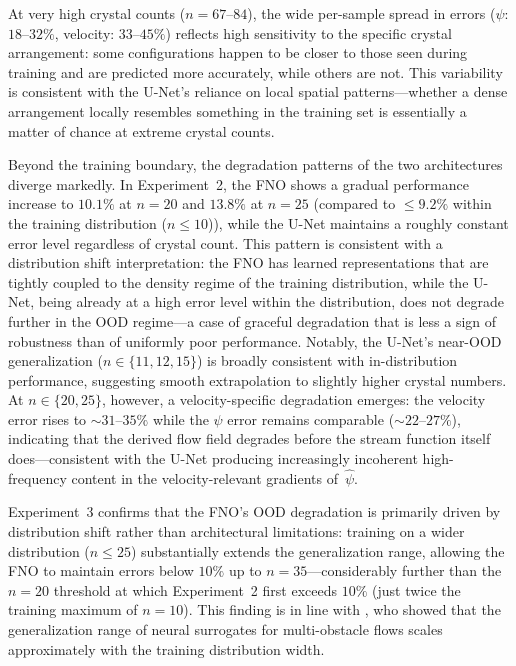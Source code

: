 At very high crystal counts ($n = 67$–$84$), the wide per-sample spread in errors ($\psi$: $18$–$32\%$, velocity: $33$–$45\%$) reflects high sensitivity to the specific crystal arrangement: some configurations happen to be closer to those seen during training and are predicted more accurately, while others are not. This variability is consistent with the U-Net's reliance on local spatial patterns—whether a dense arrangement locally resembles something in the training set is essentially a matter of chance at extreme crystal counts.

Beyond the training boundary, the degradation patterns of the two architectures diverge markedly. In Experiment~2, the FNO shows a gradual performance increase to $10.1\%$ at $n = 20$ and $13.8\%$ at $n = 25$ (compared to $\leq 9.2\%$ within the training distribution ($n \leq 10$)), while the U-Net maintains a roughly constant error level regardless of crystal count. This pattern is consistent with a distribution shift interpretation: the FNO has learned representations that are tightly coupled to the density regime of the training distribution, while the U-Net, being already at a high error level within the distribution, does not degrade further in the OOD regime—a case of graceful degradation that is less a sign of robustness than of uniformly poor performance. Notably, the U-Net's near-OOD generalization ($n \in \{11, 12, 15\}$) is broadly consistent with in-distribution performance, suggesting smooth extrapolation to slightly higher crystal numbers. At $n \in \{20, 25\}$, however, a velocity-specific degradation emerges: the velocity error rises to ${\sim}31$–$35\%$ while the $\psi$ error remains comparable (${\sim}22$–$27\%$), indicating that the derived flow field degrades before the stream function itself does—consistent with the U-Net producing increasingly incoherent high-frequency content in the velocity-relevant gradients of~$\hat\psi$.

Experiment~3 confirms that the FNO's OOD degradation is primarily driven by distribution shift rather than architectural limitations: training on a wider distribution ($n \leq 25$) substantially extends the generalization range, allowing the FNO to maintain errors below $10\%$ up to $n = 35$—considerably further than the $n = 20$ threshold at which Experiment~2 first exceeds $10\%$ (just twice the training maximum of $n = 10$). This finding is in line with \textcite{morimoto_generalization_2022}, who showed that the generalization range of neural surrogates for multi-obstacle flows scales approximately with the training distribution width.


